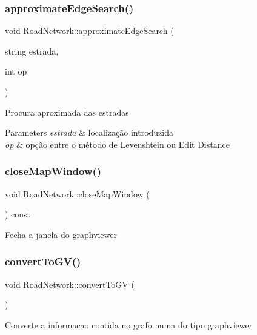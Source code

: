 \subsubsection{\texorpdfstring{approximate\+Edge\+Search()}{approximateEdgeSearch()}}
{\footnotesize\ttfamily void Road\+Network\+::approximate\+Edge\+Search (\begin{DoxyParamCaption}\item[{string}]{estrada,  }\item[{int}]{op }\end{DoxyParamCaption})}

Procura aproximada das estradas 
\begin{DoxyParams}{Parameters}
{\em estrada} & localização introduzida \\
\hline
{\em op} & opção entre o método de Levenshtein ou Edit Distance \\
\hline
\end{DoxyParams}
\mbox{\label{class_road_network_a03686fe29593c83864244d8a20bd63ed}} 
\subsubsection{\texorpdfstring{close\+Map\+Window()}{closeMapWindow()}}
{\footnotesize\ttfamily void Road\+Network\+::close\+Map\+Window (\begin{DoxyParamCaption}{ }\end{DoxyParamCaption}) const}

Fecha a janela do graphviewer \mbox{\label{class_road_network_a280633c5b00df3dfc59bc677fc12daa3}} 
\subsubsection{\texorpdfstring{convert\+To\+G\+V()}{convertToGV()}}
{\footnotesize\ttfamily void Road\+Network\+::convert\+To\+GV (\begin{DoxyParamCaption}{ }\end{DoxyParamCaption})}

Converte a informacao contida no grafo numa do tipo graphviewer \mbox{\label{class_road_network_a489db20f9d1673d607312bfd9574e3d8}} 
